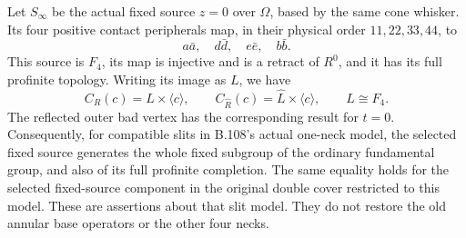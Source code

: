 Let $S_\infty$ be the actual fixed source $z=0$ over $\Omega$,
based by the same cone whisker. Its four positive contact peripherals
map, in their physical order $11,22,33,44$, to
\begin{equation}\label{eq:B110-source}
 a\bar a,\quad d\bar d,\quad e\bar e,\quad b\bar b.
\end{equation}
This source is $F_4$, its map is injective and is a retract of $R^0$,
and it has its full profinite topology. Writing its image as $L$, we have
\begin{equation}\label{eq:B110-centralizer}
 C_R(c)=L\times\langle c\rangle,
 \qquad C_{\widehat R}(c)=\widehat L\times\langle c\rangle,
 \qquad L\cong F_4.
\end{equation}
The reflected outer bad vertex has the corresponding result for $t=0$.
Consequently, for compatible slits in B.108's actual one-neck model,
the selected fixed source generates the whole fixed subgroup of the
ordinary fundamental group, and also of its full profinite completion.
The same equality holds for the selected fixed-source component in
the original double cover restricted to this model.
These are assertions about that slit model. They do not restore the
old annular base operators or the other four necks.

